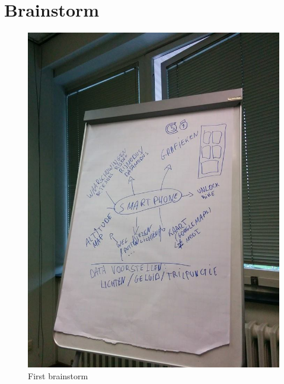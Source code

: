 \section{Brainstorm}

\begin{figure}[H]
\center
 \includegraphics[width=\linewidth]{brainstorm/brainstorm1.jpg}
 \caption{First brainstorm}
 \label{image:ganttchart}
\end{figure}
